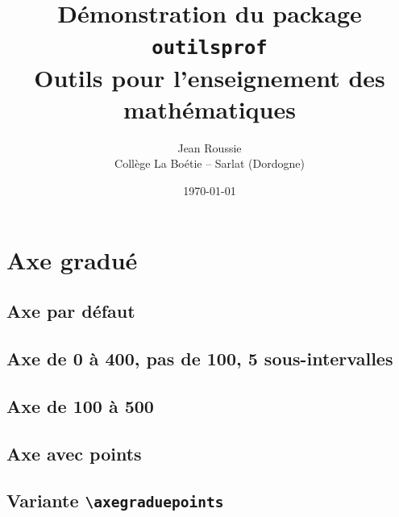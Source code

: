 \documentclass[11pt,a4paper]{article}
\title{\textbf{Démonstration du package \texttt{outilsprof}}\\
       \large Outils pour l'enseignement des mathématiques}
\author{Jean Roussie \\ \small Collège La Boétie -- Sarlat (Dordogne)}
\date{\today}
\begin{document}
\maketitle

\tableofcontents
\newpage

\section{Axe gradué}

\subsection{Axe par défaut}

\begin{center}
\axegradue
\end{center}

\subsection{Axe de 0 à 400, pas de 100, 5 sous-intervalles}

\begin{center}
\axegradue[longueur=0.8, fin=400, pas=100, nombre=5]
\end{center}

\subsection{Axe de 100 à 500}

\begin{center}
\axegradue[debut=100, fin=500, pas=100, nombre=5]
\end{center}

\subsection{Axe avec points}

\begin{center}
\axegradue[fin=400, pas=100, nombre=5, points={A/120, B/340/blue, C/60/green}]
\end{center}

\subsection{Variante \texttt{\textbackslash axegraduepoints}}
\end{document}
